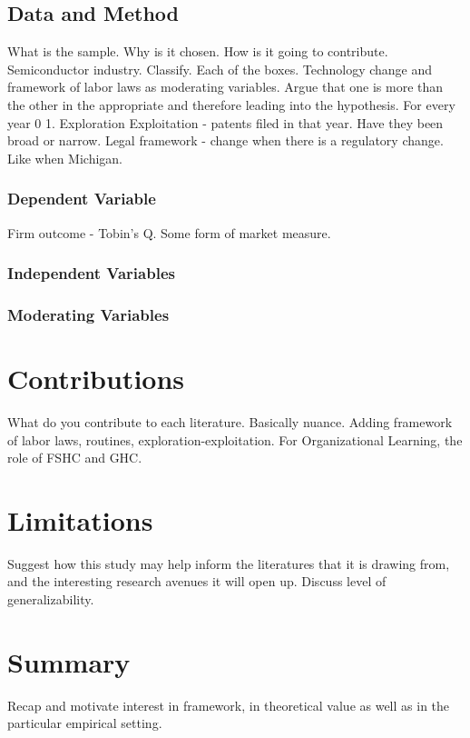 \documentclass[12pt,letterpaper]{article}
\begin{document}
\subsection{Data and Method}

What is the sample. Why is it chosen. How is it going to contribute. Semiconductor industry. Classify. Each of the boxes. Technology change and framework of labor laws as moderating variables. Argue that one is more than the other in the appropriate and therefore leading into the hypothesis. For every year 0 1. Exploration Exploitation - patents filed in that year. Have they been broad or narrow.
Legal framework - change when there is a regulatory change. Like when Michigan.

\subsubsection{Dependent Variable}
Firm outcome - Tobin's Q. Some form of market measure.

\subsubsection{Independent Variables}

\subsubsection{Moderating Variables}

\section{Contributions}
What do you contribute to each literature. Basically nuance. Adding framework of labor laws, routines, exploration-exploitation. For Organizational Learning, the role of FSHC and GHC.

\section{Limitations}
Suggest how this study may help inform the literatures that it is drawing from, and the interesting research avenues it will open up. Discuss level of generalizability.

\section{Summary}
Recap and motivate interest in framework, in theoretical value as well as in the particular empirical setting.


\begin{singlespace}
\renewcommand{\refname}{REFERENCES}
 

\end{singlespace}
\end{document}
